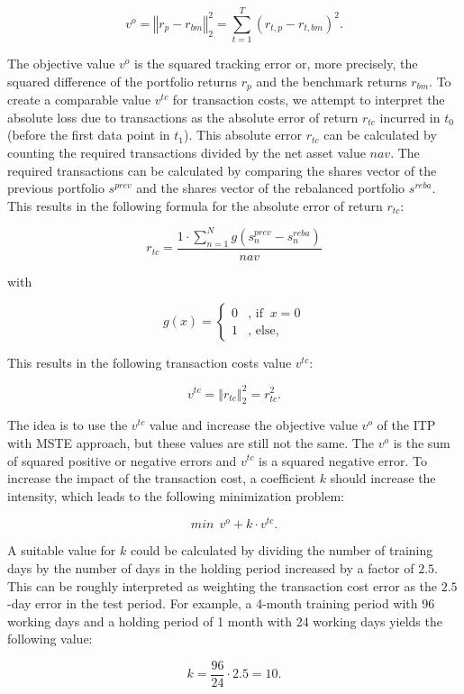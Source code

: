 \documentclass[
  oneside, a4paper, 12pt, openany]{book}
\theoremstyle{definition}
\theoremstyle{definition}
\theoremstyle{definition}
\theoremstyle{definition}
\theoremstyle{remark}
\begin{document}
\[
 v^o = \left\Vert r_{p}-r_{bm} \right\Vert_2^2 = \sum_{t=1}^T (r_{t,p}-r_{t,bm})^2.
\]

The objective value \(v^o\) is the squared tracking error or, more precisely, the squared difference of the portfolio returns \(r_p\) and the benchmark returns \(r_{bm}\). To create a comparable value \(v^{tc}\) for transaction costs, we attempt to interpret the absolute loss due to transactions as the absolute error of return \(r_{tc}\) incurred in \(t_0\) (before the first data point in \(t_1\)). This absolute error \(r_{tc}\) can be calculated by counting the required transactions divided by the net asset value \(nav\). The required transactions can be calculated by comparing the shares vector of the previous portfolio \(s^{prev}\) and the shares vector of the rebalanced portfolio \(s^{reba}\). This results in the following formula for the absolute error of return \(r_{tc}\):

\[
 r_{tc} = \frac{1 \cdot \sum_{n=1}^N g(s^{prev}_n-s^{reba}_n) }{nav}
\]

with

\[
  g(x) =    \begin{cases}
  0 &\text{, if }\ x = 0\\
  1 &\text{, else,}
  \end{cases}
\]

This results in the following transaction costs value \(v^{tc}\):

\[
v^{tc} = \left\Vert r_{tc} \right\Vert_2^2 = r_{tc}^2.
\]

The idea is to use the \(v^{tc}\) value and increase the objective value \(v^o\) of the ITP with MSTE approach, but these values are still not the same. The \(v^o\) is the sum of squared positive or negative errors and \(v^{tc}\) is a squared negative error. To increase the impact of the transaction cost, a coefficient \(k\) should increase the intensity, which leads to the following minimization problem:

\[
  min \ \  v^o + k \cdot v^{tc}.
\]

A suitable value for \(k\) could be calculated by dividing the number of training days by the number of days in the holding period increased by a factor of \(2.5\). This can be roughly interpreted as weighting the transaction cost error as the \(2.5\)-day error in the test period. For example, a 4-month training period with 96 working days and a holding period of 1 month with 24 working days yields the following value:

\[
  k = \frac{96}{24} \cdot 2.5 = 10.
\]
\end{document}

